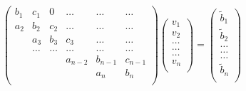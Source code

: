 \documentclass{article}
\begin{document}
\begin{equation}
    \left(\begin{array}{cccccc}
                           b_1& c_1 & 0 &\dots   & \dots &\dots \\
                           a_2 & b_2 & c_2 &\dots &\dots &\dots \\
                           & a_3 & b_3 & c_3 & \dots & \dots \\
                           & \dots   & \dots &\dots   &\dots & \dots \\
                           &   &  &a_{n-2}  &b_{n-1}& c_{n-1} \\
                           &    &  &   &a_n & b_n \\
                      \end{array} \right)\left(\begin{array}{c}
                           v_1\\
                           v_2\\
                           \dots \\
                          \dots  \\
                          \dots \\
                           v_n\\
                      \end{array} \right)
  =\left(\begin{array}{c}
                           \tilde{b}_1\\
                           \tilde{b}_2\\
                           \dots \\
                           \dots \\
                          \dots \\
                           \tilde{b}_n\\
                      \end{array} \right)
\end{equation}
\end{document}
